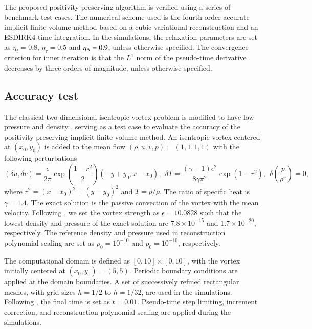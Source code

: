 The proposed positivity-preserving algorithm is verified using a series of benchmark test cases.
The numerical scheme used is the fourth-order accurate implicit finite volume method based on a
cubic variational reconstruction and an ESDIRK4 time integration.
In the simulations, the relaxation parameters are set as $\eta_t= 0.8$, $\eta_\tau=0.5$ and $\eta_\mathrm\Delta=0.9$,
unless otherwise specified.
The convergence criterion for inner iteration is that
the $L^1$ norm of the pseudo-time derivative decreases by three orders of magnitude, unless otherwise specified.

\subsection{Accuracy test}
\label{ssec:accuracy-test}

The classical two-dimensional isentropic vortex problem \cite{hu1999weighted_WENO}
is modified to have low pressure and density \cite{zhang2012positivity}, serving as a test case to evaluate the accuracy of the positivity-preserving implicit finite volume method.
An isentropic vortex centered at $(x_0,y_0)$ is added to the mean flow $(\rho, u, v, p)=(1,1,1,1)$ with the following perturbations
\begin{equation}
    (\delta u, \delta v) = \frac{\epsilon}{2\pi} \exp(\frac{1-r^2}{2}) (-y+y_0, x-x_0),\ \
    \delta T = \frac{(\gamma-1)\epsilon^2}{8\gamma \pi^2}\exp(1-r^2), \ \ \delta\left(\frac{p}{\rho^\gamma}\right)=0, 
\end{equation}
where $r^2=(x-x_0)^2+(y-y_0)^2$ and $T= p/\rho$. 
The ratio of specific heat is $\gamma=1.4$. 
The exact solution is the passive convection of the vortex with the mean velocity. 
Following \cite{zhang2012positivity}, we set the vortex strength as $\epsilon = 10.0828$ 
such that the lowest density and pressure of the exact solution are 
$7.8 \times 10^{-15}$ and $1.7 \times 10^{-20}$, respectively.
The reference density and pressure used in reconstruction polynomial scaling are 
set as $\rho_0 = 10^{-10}$ and $p_0=10^{-10}$, respectively. 

The computational domain is defined as $[0,10]\times[0,10]$, with the vortex initially centered at $(x_0,y_0)=(5,5)$. Periodic boundary conditions are applied at the domain boundaries.  A set of successively refined rectangular meshes, with grid sizes $h=1/2$ to $h=1/32$, are used in the simulations. Following \cite{zhang2012positivity}, the final time is set as $t=0.01$. 
Pseudo-time step limiting, increment correction, and reconstruction polynomial 
scaling are applied during the simulations. 

